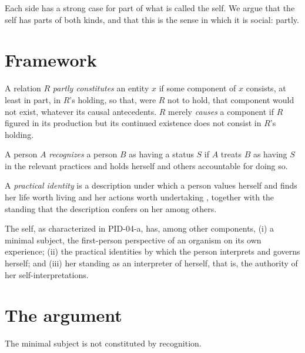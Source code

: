 \documentclass{situationist-preprint}
\begin{document}
Each side has a strong case for part of what is called the self. We argue that the self has parts of both kinds, and that this is the sense in which it is social: partly.

\section{Framework}

\begin{definition}\label{d:const}
A relation $R$ \emph{partly constitutes} an entity $x$ if some component of $x$ consists, at least in part, in $R$'s holding, so that, were $R$ not to hold, that component would not exist, whatever its causal antecedents. $R$ merely \emph{causes} a component if $R$ figured in its production but its continued existence does not consist in $R$'s holding.
\end{definition}

\begin{definition}[Recognition]\label{d:rec}
A person $A$ \emph{recognizes} a person $B$ as having a status $S$ if $A$ treats $B$ as having $S$ in the relevant practices and holds herself and others accountable for doing so.
\end{definition}

\begin{definition}\label{d:pi}
A \emph{practical identity} is a description under which a person values herself and finds her life worth living and her actions worth undertaking \citep{Korsgaard1996}, together with the standing that the description confers on her among others.
\end{definition}

\begin{assumption}\label{a:comp}
The self, as characterized in PID-04-a, has, among other components, (i) a minimal subject, the first-person perspective of an organism on its own experience; (ii) the practical identities by which the person interprets and governs herself; and (iii) her standing as an interpreter of herself, that is, the authority of her self-interpretations.
\end{assumption}

\section{The argument}

\begin{lemma}\label{l:minimal}
The minimal subject is not constituted by recognition.
\end{lemma}
\end{document}
